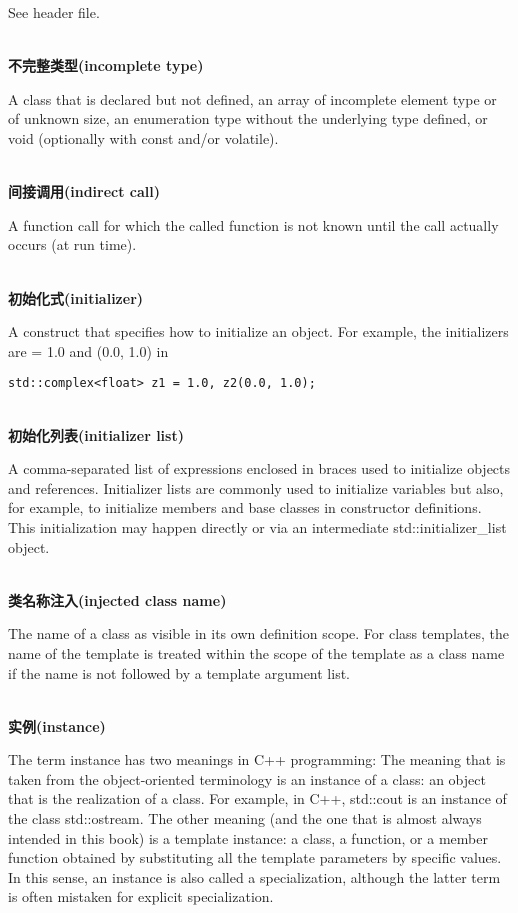 See header file.

\hspace*{\fill} \\ %
\noindent
\textbf{不完整类型(incomplete type)}

A class that is declared but not defined, an array of incomplete element type or of unknown size, an enumeration type without the underlying type defined, or void (optionally with const and/or volatile).

\hspace*{\fill} \\ %
\noindent
\textbf{间接调用(indirect call)}

A function call for which the called function is not known until the call actually occurs (at run time).

\hspace*{\fill} \\ %
\noindent
\textbf{初始化式(initializer)}

A construct that specifies how to initialize an object. For example, the initializers are = 1.0 and (0.0, 1.0) in
\begin{lstlisting}[style=styleCXX]
std::complex<float> z1 = 1.0, z2(0.0, 1.0);
\end{lstlisting}

\hspace*{\fill} \\ %
\noindent
\textbf{初始化列表(initializer list)}

A comma-separated list of expressions enclosed in braces used to initialize objects and references. Initializer lists are commonly used to initialize variables but also, for example, to initialize members and base classes in constructor definitions. This initialization may happen directly or via an intermediate std::initializer\_list object.

\hspace*{\fill} \\ %
\noindent
\textbf{类名称注入(injected class name)}

The name of a class as visible in its own definition scope. For class templates, the name of the template is treated within the scope of the template as a class name if the name is not followed by a template argument list.

\hspace*{\fill} \\ %
\noindent
\textbf{实例(instance)}

The term instance has two meanings in C++ programming: The meaning that is taken from the object-oriented terminology is an instance of a class: an object that is the realization of a class. For example, in C++, std::cout is an instance of the class std::ostream. The other meaning (and the one that is almost always intended in this book) is a template instance: a class, a function, or a member function obtained by substituting all the template parameters by specific values. In this sense, an instance is also called a specialization, although the latter term is often mistaken for explicit specialization.

